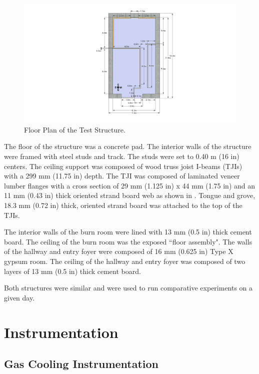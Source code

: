 \documentclass[12pt,oneside]{book}
\begin{document}
\begin{figure}[!ht]
	\includegraphics[width=6in]{../Figures/Pictures/DelCoSingleStoryDimensionsMetric}
	\caption{Floor Plan of the Test Structure.}
	\label{fig:Test_Structure_Floor_Plan}
\end{figure}
    
The floor of the structure was a concrete pad.  The interior walls of the structure were framed with steel studs and track.  The studs were set to 0.40 m (16 in) centers.  The ceiling support was composed of wood truss joist I-beams (TJIs) with a 299 mm (11.75 in) depth.  The TJI was composed of laminated veneer lumber flanges with a cross section of 29 mm (1.125 in) x 44 mm (1.75 in) and an 11 mm (0.43 in) thick oriented strand board web as shown in .  Tongue and grove, 18.3 mm (0.72 in) thick, oriented strand board was attached to the top of the TJIs.     

The interior walls of the burn room were lined with 13 mm (0.5 in) thick cement board.  The ceiling of the burn room was the exposed ``floor assembly".  The walls of the hallway and entry foyer were composed of 16 mm (0.625 in) Type X gypsum room. The ceiling of the hallway and entry foyer was composed of two layers of 13 mm (0.5 in) thick cement board.    

Both structures were similar and were used to run comparative experiments on a given day.

\section{Instrumentation}
\label{sec:Instrumentation}

\subsection{Gas Cooling Instrumentation} 
\label{subsec:Gas_Cooling_Instrumentation}
\end{document}
